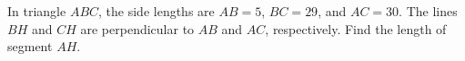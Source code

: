 In triangle $ABC$, the side lengths are $AB = 5$, $BC = 29$, and $AC = 30$. The lines $BH$ and $CH$ are perpendicular to $AB$ and $AC$, respectively. Find the length of segment $AH$.
